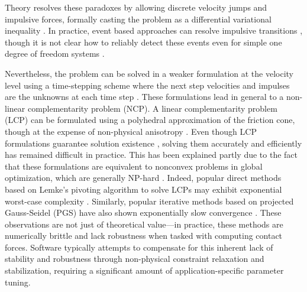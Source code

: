 %
Theory resolves these paradoxes by allowing discrete velocity jumps and
impulsive forces, formally casting the problem as a differential variational
inequality \cite{bib:pang2008differential}. In practice, event based approaches
can resolve impulsive transitions \cite{bib:haug1986}, though it is not clear
how to reliably detect these events even for simple one degree of freedom
systems \cite{bib:hogan2017regularization}.

Nevertheless, the problem can be solved in a weaker formulation at the velocity
level using a time-stepping scheme where the next step velocities and impulses
are the unknowns at each time step \cite{bib:stewart1996implicit,
bib:anitescu1997}. These formulations lead in general to a non-linear
complementarity problem (NCP). A linear complementarity problem (LCP) can be
formulated using a polyhedral approximation of the friction cone, though at the
expense of non-physical anisotropy \cite{bib:li2018implicit}. Even though LCP
formulations guarantee solution existence \cite{bib:anitescu1997,
bib:stewart1998convergence}, solving them accurately and efficiently has
remained difficult in practice. This has been explained partly due to the fact
that these formulations are equivalent to nonconvex problems in global
optimization, which are generally NP-hard \cite{bib:Kaufman2008}. Indeed,
popular direct methods based on Lemke's pivoting algorithm to solve LCPs may
exhibit exponential worst-case complexity \cite{bib:baraff1994fast}. Similarly,
popular iterative methods based on projected Gauss-Seidel (PGS)
\cite{bib:duriez2006_realistic_haptic_rendering, bib:bullet} have also shown
exponentially slow convergence \cite{bib:erleben2007velocity}. These
observations are not just of theoretical value---in practice, these methods are
numerically brittle and lack robustness when tasked with computing contact
forces. Software typically attempts to compensate for this inherent lack of
stability and robustness through non-physical constraint relaxation and
stabilization, requiring a significant amount of application-specific parameter
tuning.

